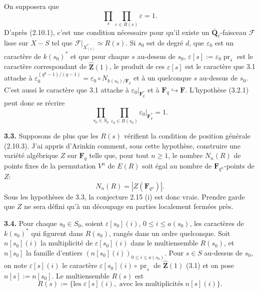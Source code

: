 \documentclass[11pt]{article}
\newcommand{\Fq}{\mathbf{F}_q}
\newcommand{\Fqn}{\mathbf{F}_{q^n}}
\newcommand{\F}{\mathbf{F}}
\newcommand{\Qbl}{\overline{\mathbf{Q}}_{\ell}}
\newcommand{\Zhat}{\widehat{\mathbf{Z}}}
\newcommand{\Fcal}{\mathcal{F}}
\newcommand{\para}[1]{\medskip\noindent\textbf{#1}\enspace}
\begin{document}
On supposera que
\begin{equation}
  \prod_s\prod_{\varepsilon\in R(s)}\varepsilon=1.
\tag{3.2.1}
\end{equation}
D'après (2.10.1), c'est une condition nécessaire pour qu'il existe un \(\Qbl\)-faisceau \(\Fcal\) lisse sur \(X-S\) tel que \(\Fcal|_{X_{(s)}^*}\simeq R(s)\). Si \(s_0\) est de degré \(d\), que \(\varepsilon_0\) est un caractère de \(k(s_0)^*\) et que pour chaque \(s\) au-dessus de \(s_0\), \(\varepsilon[s]:=\varepsilon_0\operatorname{pr}_s\) est le caractère correspondant de \(\Zhat(1)\), le produit de ces \(\varepsilon[s]\) est le caractère que 3.1 attache à \(\varepsilon_0^{(q^d-1)/(q-1)}=\varepsilon_0\circ N_{k(s_0)/\Fq}\) et à un quelconque \(s\) au-dessus de \(s_0\). C'est aussi le caractère que 3.1 attache à \(\varepsilon_0|_{\Fq^*}\) et à \(\Fq\hookrightarrow\F\). L'hypothèse (3.2.1) peut donc se récrire
\begin{equation}
  \prod_{s_0\in S_0}\prod_{\varepsilon_0\in R(s_0)}\varepsilon_0|_{\Fq^*}=1.
\tag{3.2.2}
\end{equation}

\para{3.3.} Supposons de plus que les \(R(s)\) vérifient la condition de position générale (2.10.3). J'ai appris d'Arinkin comment, sous cette hypothèse, construire une variété algébrique \(Z\) sur \(\Fq\) telle que, pour tout \(n\geq1\), le nombre \(N_n(R)\) de points fixes de la permutation \(V^n\) de \(E(R)\) soit égal au nombre de \(\Fqn\)-points de \(Z\):
\begin{equation}
  N_n(R)=|Z(\Fqn)|.
\tag{3.3.1}
\end{equation}
Sous les hypothèses de 3.3, la conjecture 2.15 (i) est donc vraie. Prendre garde que \(Z\) ne sera défini qu'à un découpage en parties localement fermées près.

\para{3.4.} Pour chaque \(s_0\in S_0\), soient \(\varepsilon[s_0](i)\), \(0\leq i\leq a(s_0)\), les caractères de \(k(s_0)^*\) qui figurent dans \(R(s_0)\), rangés dans un ordre quelconque. Soit \(n[s_0](i)\) la multiplicité de \(\varepsilon[s_0](i)\) dans le multiensemble \(R(s_0)\), et \(n[s_0]\) la famille d'entiers \((n[s_0](i))_{0\leq i\leq a(s_0)}\). Pour \(s\in S\) au-dessus de \(s_0\), on note \(\varepsilon[s](i)\) le caractère \(\varepsilon[s_0](i)\circ\operatorname{pr}_s\) de \(\Zhat(1)\) (3.1) et on pose \(n[s]:=n[s_0]\). Le multiensemble \(R(s)\) est
\begin{equation}
  R(s):=\{\text{les }\varepsilon[s](i),\text{ avec les multiplicités }n[s](i)\}.
\tag{3.4.1}
\end{equation}
\end{document}
